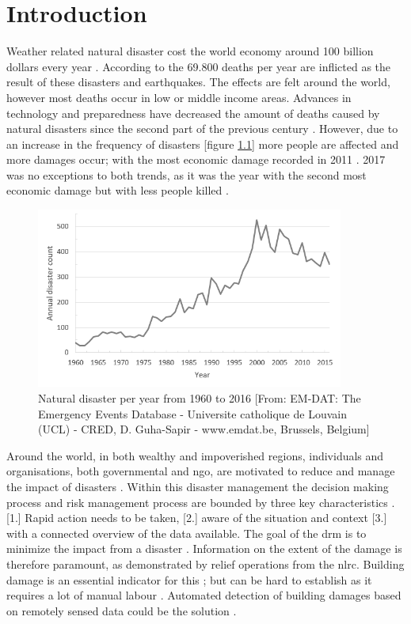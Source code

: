 \chapter{Introduction} \label{intro}

Weather related natural disaster cost the world economy around 100 billion dollars every year \citep{Kousky2014}. According to the \citet{CRED2015} 69.800 deaths per year are inflicted as the result of these disasters and earthquakes. The effects are felt around the world, however most deaths occur in low or middle income areas. Advances in technology and preparedness have decreased the amount of deaths caused by natural disasters since the second part of the previous century \citep{UN2004}. However, due to an increase in the frequency of disasters [figure \ref{fig:graph1}] more people are affected and more damages occur; with the most economic damage recorded in 2011 \citep{Coppola2015, Kerle2015}. 2017 was no exceptions to both trends, as it was the year with the second most economic damage but with less people killed \citep{RE2018}.  

\begin{figure}[h]
	\centering
	\includegraphics[width=0.9\textwidth]{figs/graph2.png}
	\caption{Natural disaster per year from 1960 to 2016 [From:  EM-DAT: The Emergency Events Database - Universite catholique de Louvain (UCL) - CRED, D. Guha-Sapir - www.emdat.be, Brussels, Belgium]}
	\label{fig:graph1}
\end{figure}

\noindent Around the world, in both wealthy and impoverished regions, individuals and organisations, both governmental and \ac{ngo}, are motivated to reduce and manage the impact of disasters \citep{Coppola2015}. Within this disaster management the decision making process and risk management process are bounded by three key characteristics \citep{Zlatanova2008}. [1.] Rapid action needs to be taken, [2.] aware of the situation and context [3.] with a connected overview of the data available. The goal of the \ac{drm} is to minimize the impact from a disaster \citep{Piero2012}. Information on the extent of the damage is therefore paramount, as demonstrated by relief operations from the \ac{nlrc}. Building damage is an essential indicator for this \citep{Schweier2006}; but can be hard to establish as it requires a lot of manual labour \citep{Kerle2010}. Automated detection of building damages based on remotely sensed data could be the solution \citep{Vetrivel2016b}. \\


